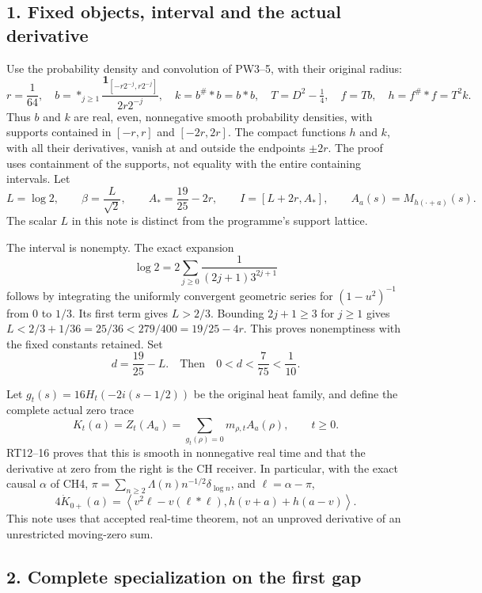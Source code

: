 \documentclass[
  10pt,
  a4paper,
]{article}
\begin{document}
\subsection{1. Fixed objects, interval and the actual
derivative}\label{fixed-objects-interval-and-the-actual-derivative}

Use the probability density and convolution of PW3--5, with their
original radius: \[
r=\frac1{64},\quad
b=\mathop{*}_{j\ge1}\frac{\mathbf1_{[-r2^{-j},r2^{-j}]}}{2r2^{-j}},
\quad k=b^\#*b=b*b,\quad T=D^2-\tfrac14,
\quad f=Tb,\quad h=f^\#*f=T^2k.
\tag{PT1}
\] Thus \(b\) and \(k\) are real, even, nonnegative smooth probability
densities, with supports contained in \([-r,r]\) and \([-2r,2r]\). The
compact functions \(h\) and \(k\), with all their derivatives, vanish at
and outside the endpoints \(\pm2r\). The proof uses containment of the
supports, not equality with the entire containing intervals. Let \[
L=\log2,\qquad \beta=\frac{L}{\sqrt2},\qquad
A_* =\frac{19}{25}-2r,
\qquad I=[L+2r,A_*],\qquad
A_a(s)=M_{h(\cdot+a)}(s).
\tag{PT2}
\] The scalar \(L\) in this note is distinct from the programme's
support lattice.

The interval is nonempty. The exact expansion \[
\log2=2\sum_{j\ge0}\frac{1}{(2j+1)3^{2j+1}}
\tag{PT3}
\] follows by integrating the uniformly convergent geometric series for
\((1-u^2)^{-1}\) from 0 to \(1/3\). Its first term gives \(L>2/3\).
Bounding \(2j+1\ge3\) for \(j\ge1\) gives
\(L<2/3+1/36=25/36<279/400=19/25-4r\). This proves nonemptiness with the
fixed constants retained. Set \[
d=\frac{19}{25}-L.
\quad\text{Then}\quad 0<d<\frac7{75}<\frac1{10}.
\tag{PT4}
\]

Let \(g_t(s)=16H_t(-2i(s-1/2))\) be the original heat family, and define
the complete actual zero trace \[
K_t(a)=Z_t(A_a)=\sum_{g_t(\rho)=0}m_{\rho,t}A_a(\rho),\qquad t\ge0.
\tag{PT5}
\] RT12--16 proves that this is smooth in nonnegative real time and that
the derivative at zero from the right is the CH receiver. In particular,
with the exact causal \(\alpha\) of CH4,
\(\pi=\sum_{n\ge2}\Lambda(n)n^{-1/2}\delta_{\log n}\), and
\(\ell=\alpha-\pi\), \[
4\dot K_{0+}(a)
=\left\langle v^2\ell-v(\ell*\ell),
h(v+a)+h(a-v)\right\rangle.
\tag{PT6}
\] This note uses that accepted real-time theorem, not an unproved
derivative of an unrestricted moving-zero sum.

\subsection{2. Complete specialization on the first
gap}\label{complete-specialization-on-the-first-gap}
\end{document}
